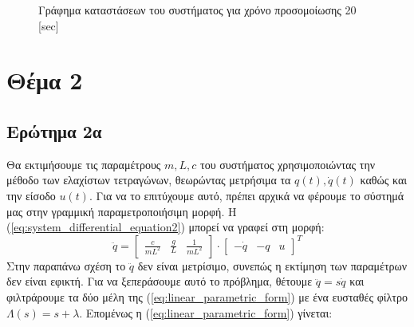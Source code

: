 \documentclass[a4paper,12pt]{article}
\begin{document}
\begin{figure}[!h]
\begin{minipage}{0.45\textwidth}
        \caption{Γράφημα καταστάσεων του συστήματος για χρόνο προσομοίωσης 20 
        [sec]}
        \label{fig:task1_system_states}
    \end{minipage}
\end{figure}

\section*{Θέμα 2}
\subsection*{Ερώτημα 2α}
Θα εκτιμήσουμε τις παραμέτρους $m, L, c$ του συστήματος χρησιμοποιώντας την μέθοδο των ελαχίστων τετραγώνων, 
θεωρώντας μετρήσιμα τα $q(t), \dot{q}(t)$ καθώς και την είσοδο $u(t)$. Για να το επιτύχουμε αυτό, πρέπει αρχικά 
να φέρουμε το σύστημά μας στην γραμμική παραμετροποιήσιμη μορφή. Η (\ref{eq:system_differential_equation2}) μπορεί 
να γραφεί στη μορφή:
\begin{equation}
    \ddot{q} =
    \left[
    \begin{matrix}
        \frac{c}{mL^2} & \frac{g}{L} & \frac{1}{mL^2}
    \end{matrix}
    \right]
    \cdot
    \left[
    \begin{matrix}
        -\dot{q} & -q & u
    \end{matrix}
    \right]^T
    \label{eq:linear_parametric_form}
\end{equation}
Στην παραπάνω σχέση το $\ddot{q}$ δεν είναι μετρίσιμο, συνεπώς η εκτίμηση των παραμέτρων δεν είναι εφικτή.
Για να ξεπεράσουμε αυτό το πρόβλημα, θέτουμε $\ddot{q} = s\dot{q}$ και φιλτράρουμε τα δύο μέλη της 
(\ref{eq:linear_parametric_form}) με ένα ευσταθές φίλτρο $\Lambda(s) = s + \lambda$. Επομένως η 
(\ref{eq:linear_parametric_form}) γίνεται:
\end{document}

